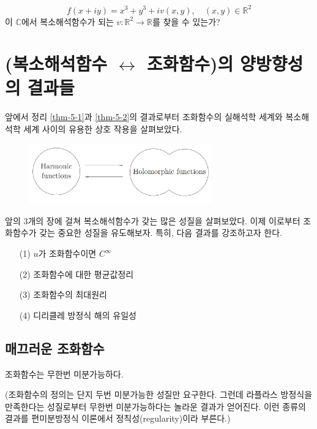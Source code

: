 \begin{salt_exercise}\label{ex-5-6}
\[
f (x+iy)= x^3+y^3 + iv(x,y),\quad (x,y)\in \mathbb R^2
\]
이 $\mathbb C$에서 복소해석함수가 되는 $v:\mathbb R^2 \to \mathbb R$를
찾을 수 있는가? 
\end{salt_exercise}

\section{(복소해석함수 $\leftrightarrow$ 조화함수)의 양방향성의 결과들}

앞에서 정리 \ref{thm-5-1}과 \ref{thm-5-2}의 결과로부터 조화함수의 실해석학 세계와
복소해석학 세계 사이의 유용한 상호 작용을 살펴보았다.

\begin{figure}[h!]
\begin{center}
\includegraphics[width=0.7\textwidth]{./SaltChapter/fig-5-0-1}
\end{center}
\end{figure}

앞의 3개의 장에 걸쳐 복소해석함수가 갖는 많은 성질을 살펴보았다.
이제 이로부터 조화함수가 갖는 중요한 성질을 유도해보자.
특히, 다음 결과를 강조하고자 한다.
\begin{itemize}
\item[(1)] $u$가 조화함수이면 $C^\infty$
\item[(2)] 조화함수에 대한 평균값정리
\item[(3)] 조화함수의 최대원리
\item[(4)] 디리클레 방정식 해의 유일성
\end{itemize}

\subsection{매끄러운 조화함수}

\begin{salt_corollary}\label{coro-5-1}
조화함수는 무한번 미분가능하다.
\end{salt_corollary}

(조화함수의 정의는 단지 두번 미분가능한 성질만 요구한다.
그런데 라플라스 방정식을 만족한다는 성질로부터 무한번 미분가능하다는 놀라운 결과가 얻어진다.
이런 종류의 결과를 편미분방정식 이론에서 정칙성(regularity)이라 부른다.)

